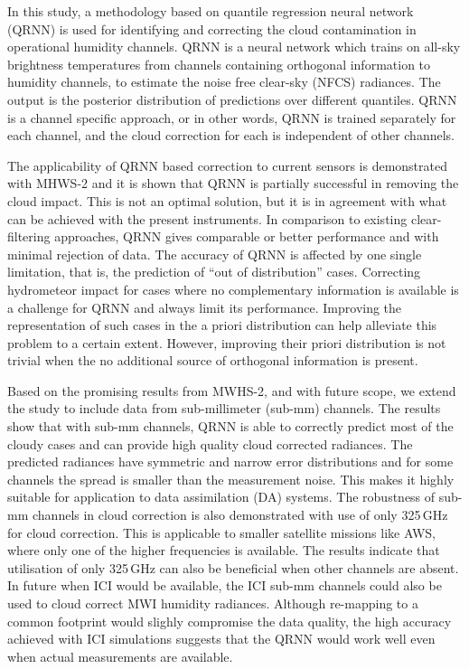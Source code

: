 \documentclass[amt, manuscript]{copernicus}
\begin{document}
In this study, a methodology based on quantile regression neural network (QRNN) is used for identifying and correcting the cloud contamination in operational humidity channels. QRNN is a neural network which trains on all-sky brightness temperatures from  channels containing orthogonal information to humidity channels, to estimate the noise free clear-sky (NFCS) radiances. The output is the posterior distribution of predictions over different quantiles. QRNN is a channel specific approach, or in other words, QRNN is trained separately for each channel, and the cloud correction for each is independent of other channels. 
 
The applicability of QRNN based correction to current sensors is demonstrated with MHWS-2 and it is shown that QRNN is partially successful in removing the cloud impact. This is not  an optimal solution, but it is in agreement with what can be achieved with the present instruments. In comparison to existing clear-filtering approaches, QRNN gives comparable or better performance and with minimal rejection of data. The accuracy of QRNN is affected by one single limitation, that is, the prediction of ``out of distribution'' cases. Correcting hydrometeor impact for cases where no complementary information is available is a challenge for QRNN and always limit its performance. Improving the representation of such cases in the a priori distribution can help alleviate this problem to a certain extent. However, improving their priori distribution is not trivial when the no additional source of orthogonal information is present. 

Based on the promising results from MWHS-2, and with future scope, we extend the study to include data from sub-millimeter (sub-mm) channels. The results show that with  sub-mm channels, QRNN is able to correctly predict most of the cloudy cases and can provide high quality cloud corrected radiances. The predicted radiances have symmetric and narrow error distributions and for some channels the spread is smaller than the measurement noise. This makes it highly suitable for application to data assimilation (DA) systems. The robustness of sub-mm channels in cloud correction is also demonstrated with use of only 325\,GHz for cloud correction. This is applicable to smaller satellite missions like AWS, where only one of the higher frequencies is available. The results indicate that utilisation of only 325\,GHz can also be beneficial when other channels are absent. In future when ICI would be available, the ICI sub-mm channels could also be used to cloud correct MWI humidity radiances. Although re-mapping to a common footprint would slighly compromise the data quality, the high accuracy achieved with ICI simulations suggests that the QRNN would work well even when actual measurements are available.
\end{document}
